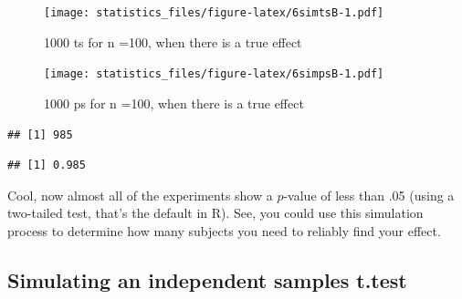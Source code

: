 \documentclass[]{book}
\newenvironment{Shaded}{\begin{snugshade}}{\end{snugshade}}
\newcommand{\ControlFlowTok}[1]{\textcolor[rgb]{0.13,0.29,0.53}{\textbf{#1}}}
\newcommand{\DataTypeTok}[1]{\textcolor[rgb]{0.13,0.29,0.53}{#1}}
\newcommand{\DecValTok}[1]{\textcolor[rgb]{0.00,0.00,0.81}{#1}}
\newcommand{\KeywordTok}[1]{\textcolor[rgb]{0.13,0.29,0.53}{\textbf{#1}}}
\newcommand{\NormalTok}[1]{#1}
\newcommand{\OperatorTok}[1]{\textcolor[rgb]{0.81,0.36,0.00}{\textbf{#1}}}
\newcommand{\StringTok}[1]{\textcolor[rgb]{0.31,0.60,0.02}{#1}}
\begin{document}
\begin{Shaded}
\end{Shaded}

\begin{figure}
\centering
\texttt{[image: statistics\_files/figure-latex/6simtsB-1.pdf]}
\caption{\label{fig:6simtsB}1000 ts for n =100, when there is a true effect}
\end{figure}

\begin{figure}
\centering
\texttt{[image: statistics\_files/figure-latex/6simpsB-1.pdf]}
\caption{\label{fig:6simpsB}1000 ps for n =100, when there is a true effect}
\end{figure}

\begin{verbatim}
## [1] 985
\end{verbatim}

\begin{verbatim}
## [1] 0.985
\end{verbatim}

Cool, now almost all of the experiments show a \(p\)-value of less than .05 (using a two-tailed test, that's the default in R). See, you could use this simulation process to determine how many subjects you need to reliably find your effect.

\hypertarget{simulating-an-independent-samples-t.test}{%
\subsection{Simulating an independent samples t.test}\label{simulating-an-independent-samples-t.test}}
\end{document}
